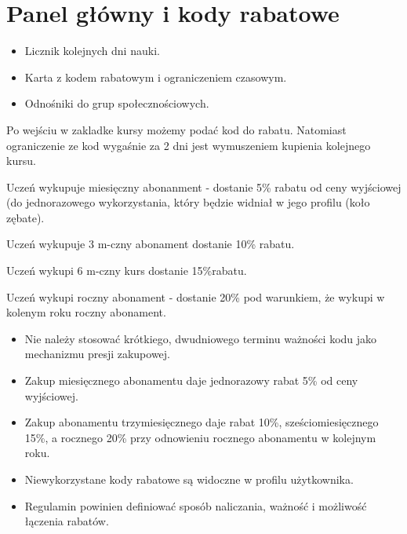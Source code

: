 \documentclass[12pt,a4paper]{report}
\begin{document}
\section{Panel główny i kody rabatowe}
\begin{ElearnObservedUI}
\begin{itemize}
  \item Licznik kolejnych dni nauki.
  \item Karta z kodem rabatowym i ograniczeniem czasowym.
  \item Odnośniki do grup społecznościowych.
\end{itemize}
\end{ElearnObservedUI}
\begin{ElearnReviewComment}[title={Komentarz nr 3 -- Anna Kogut, 2026-07-22}]
Po wejściu w zakladke kursy możemy podać kod do rabatu. Natomiast ograniczenie ze kod wygaśnie za 2 dni jest wymuszeniem kupienia kolejnego kursu.

Uczeń wykupuje miesięczny abonanment - dostanie 5\% rabatu od ceny wyjściowej (do jednorazowego wykorzystania, który będzie widniał w jego profilu (koło zębate).

Uczeń wykupuje 3 m-czny abonament dostanie 10\% rabatu.

Uczeń wykupi 6 m-czny kurs dostanie 15\%rabatu.

Uczeń wykupi roczny abonament - dostanie 20\% pod warunkiem, że wykupi w kolenym roku roczny abonament.
\end{ElearnReviewComment}
\begin{ElearnRequirement}[title={Wymagania wynikające z komentarza}]
\begin{itemize}
  \item Nie należy stosować krótkiego, dwudniowego terminu ważności kodu jako mechanizmu presji zakupowej.
  \item Zakup miesięcznego abonamentu daje jednorazowy rabat 5\% od ceny wyjściowej.
  \item Zakup abonamentu trzymiesięcznego daje rabat 10\%, sześciomiesięcznego 15\%, a rocznego 20\% przy odnowieniu rocznego abonamentu w kolejnym roku.
  \item Niewykorzystane kody rabatowe są widoczne w profilu użytkownika.
  \item Regulamin powinien definiować sposób naliczania, ważność i możliwość łączenia rabatów.
\end{itemize}
\end{ElearnRequirement}
\end{document}
